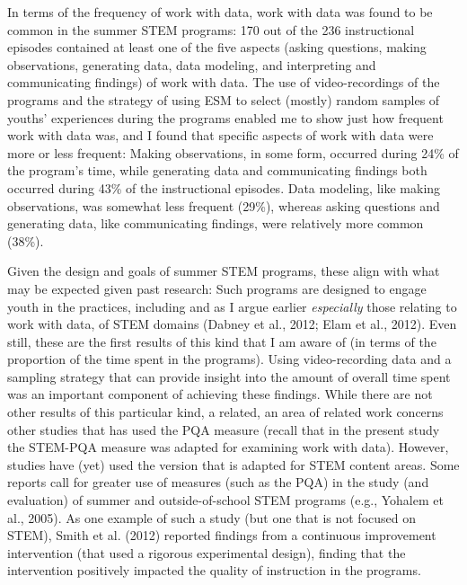 \documentclass[]{msu-thesis}
\theoremstyle{definition}
\theoremstyle{definition}
\theoremstyle{definition}
\theoremstyle{remark}
\begin{document}
In terms of the frequency of work with data, work with data was found to
be common in the summer STEM programs: 170 out of the 236 instructional
episodes contained at least one of the five aspects (asking questions,
making observations, generating data, data modeling, and interpreting
and communicating findings) of work with data. The use of
video-recordings of the programs and the strategy of using ESM to select
(mostly) random samples of youths' experiences during the programs
enabled me to show just how frequent work with data was, and I found
that specific aspects of work with data were more or less frequent:
Making observations, in some form, occurred during 24\% of the program's
time, while generating data and communicating findings both occurred
during 43\% of the instructional episodes. Data modeling, like making
observations, was somewhat less frequent (29\%), whereas asking
questions and generating data, like communicating findings, were
relatively more common (38\%).

Given the design and goals of summer STEM programs, these align with
what may be expected given past research: Such programs are designed to
engage youth in the practices, including and as I argue earlier
\emph{especially} those relating to work with data, of STEM domains
(Dabney et al., 2012; Elam et al., 2012). Even still, these are the
first results of this kind that I am aware of (in terms of the
proportion of the time spent in the programs). Using video-recording
data and a sampling strategy that can provide insight into the amount of
overall time spent was an important component of achieving these
findings. While there are not other results of this particular kind, a
related, an area of related work concerns other studies that has used
the PQA measure (recall that in the present study the STEM-PQA measure
was adapted for examining work with data). However, studies have (yet)
used the version that is adapted for STEM content areas. Some reports
call for greater use of measures (such as the PQA) in the study (and
evaluation) of summer and outside-of-school STEM programs (e.g., Yohalem
et al., 2005). As one example of such a study (but one that is not
focused on STEM), Smith et al. (2012) reported findings from a
continuous improvement intervention (that used a rigorous experimental
design), finding that the intervention positively impacted the quality
of instruction in the programs.
\end{document}
